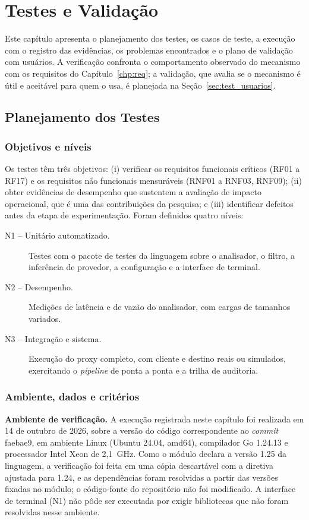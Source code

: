 \chapter{Testes e Validação}\label{chp:test}

Este capítulo apresenta o planejamento dos testes, os casos de teste, a execução com o registro das evidências, os problemas encontrados e o plano de validação com usuários. A verificação confronta o comportamento observado do mecanismo com os requisitos do Capítulo~\ref{chp:req}; a validação, que avalia se o mecanismo é útil e aceitável para quem o usa, é planejada na Seção~\ref{sec:test_usuarios}.

\section{Planejamento dos Testes}
\label{sec:test_plano}

\subsection{Objetivos e níveis}

Os testes têm três objetivos: (i) verificar os requisitos funcionais críticos (RF01 a RF17) e os requisitos não funcionais mensuráveis (RNF01 a RNF03, RNF09); (ii) obter evidências de desempenho que sustentem a avaliação de impacto operacional, que é uma das contribuições da pesquisa; e (iii) identificar defeitos antes da etapa de experimentação. Foram definidos quatro níveis:

\begin{description}
    \item[N1 -- Unitário automatizado.] Testes com o pacote de testes da linguagem sobre o analisador, o filtro, a inferência de provedor, a configuração e a interface de terminal.
    \item[N2 -- Desempenho.] Medições de latência e de vazão do analisador, com cargas de tamanhos variados.
    \item[N3 -- Integração e sistema.] Execução do proxy completo, com cliente e destino reais ou simulados, exercitando o \textit{pipeline} de ponta a ponta e a trilha de auditoria.
\end{description}

\subsection{Ambiente, dados e critérios}

\textbf{Ambiente de verificação.} A execução registrada neste capítulo foi realizada em 14 de outubro de 2026, sobre a versão do código correspondente ao \textit{commit} faebae9, em ambiente Linux (Ubuntu 24.04, amd64), compilador Go 1.24.13 e processador Intel Xeon de 2,1~GHz. Como o módulo declara a versão 1.25 da linguagem, a verificação foi feita em uma cópia descartável com a diretiva ajustada para 1.24, e as dependências foram resolvidas a partir das versões fixadas no módulo; o código-fonte do repositório não foi modificado. A interface de terminal (N1) não pôde ser executada por exigir bibliotecas que não foram resolvidas nesse ambiente.


